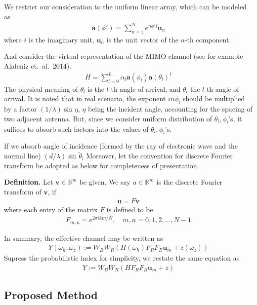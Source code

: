 \documentclass[12pt]{article}
\newcounter{NumResult}
\newcommand{\myCount}
{
   \stepcounter{NumResult}
   \textbf{\arabic{NumResult}}
}
\begin{document}
We restrict our consideration to the uniform linear array, which can be modeled as
\begin{gather}
\mathbf{a}(\phi')
=\sum_{n=1}^{N} e^{n \phi' i} \mathbf{u}_n
\end{gather}
where \(i\) is the imaginary unit, \(\mathbf{u}_n\) is the unit vector of the \(n\)-th component.

And consider the virtual representation of the MIMO channel (see for example Akdeniz et.\ al.\ 2014).
\begin{gather}
H
=\sum_{l=0}^L \alpha_l \mathbf{a}(\phi_l) \mathbf{a}(\theta_l)^\dagger
\end{gather}
The physical meaning of \(\theta_l\) is the \(l\)-th angle of arrival, and \(\theta_l\) the \(l\)-th angle of arrival.
It is noted that in real scenario, the exponent \(i n \phi_l\) should be multiplied by a factor \((1/\lambda) \sin \eta\), \(\eta\) being the incident angle, accounting for the spacing of two adjacent antenna.
But, since we consider uniform distribution of \(\theta_l, \phi_l\)'s, it suffices to absorb such factors into the values of \(\theta_l, \phi_l\)'s.

If we absorb angle of incidence (formed by the ray of electronic wave and the normal line)
\((d/\lambda) \sin \tilde{\theta}_l\)
Moreover, let the convention for discrete Fourier transform be adopted as below for completeness of presentation.



\myCount
\textbf{Definition.} Let \(\mathbf{v} \in \mathbb{R}^m\) be given.
We say \(u \in \mathbb{R}^m\) is the discrete Fourier transform of \(\mathbf{v}\), if
\begin{gather}
\mathbf{u} =F \mathbf{v}
\end{gather}
where each entry of the matrix \(F\) is defined to be
\begin{gather}
F_{m,n} =e^{2\pi ikm/N},
\quad m,n =0,1,2,\dotsc, N-1
\end{gather}

In summary, the effective channel may be written as
\begin{gather}
Y (\omega_h, \omega_z)
:=W_B W_R ( H(\omega_h) F_R F_B \mathbf{u}_m +z(\omega_z) )
\end{gather}
Supress the probabilistic index for simplicity, we restate the same equation as
\begin{gather}
Y
:=W_B W_R ( H F_R F_B \mathbf{u}_m +z )
\end{gather}

\subsection{Proposed Method}
\end{document}
